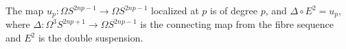 The map $u_p \colon \Omega S^{2np-1} \to \Omega S^{2np-1}$ localized at $p$ is of degree $p$, and $\Delta \circ E^2 = u_p$, where $\Delta \colon \Omega^3 S^{2np+1} \to \Omega S^{2np-1}$ is the connecting map from the fibre sequence and $E^2$ is the double suspension.
